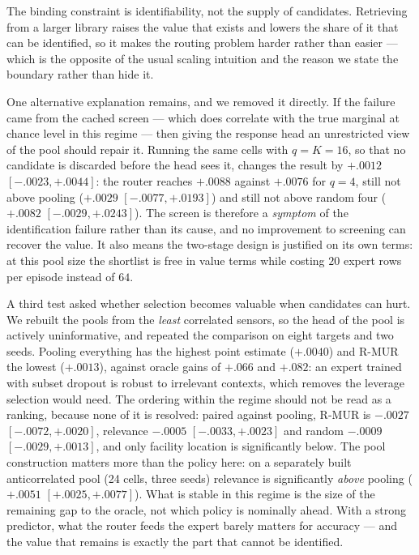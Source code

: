 The binding constraint is identifiability, not the supply of candidates.
Retrieving from a larger library raises the value that exists and lowers the
share of it that can be identified, so it makes the routing problem harder
rather than easier --- which is the opposite of the usual scaling intuition and
the reason we state the boundary rather than hide it.

One alternative explanation remains, and we removed it directly. If the failure
came from the cached screen --- which does correlate with the true marginal at
chance level in this regime --- then giving the response head an unrestricted
view of the pool should repair it. Running the same cells with $q=K=16$, so
that no candidate is discarded before the head sees it, changes the result by
$+.0012$ $[-.0023,+.0044]$: the router reaches $+.0088$ against $+.0076$ for
$q=4$, still not above pooling ($+.0029$ $[-.0077,+.0193]$) and still not above
random four ($+.0082$ $[-.0029,+.0243]$). The screen is therefore a \emph{symptom}
of the identification failure rather than its cause, and no improvement to
screening can recover the value. It also means the two-stage design is
justified on its own terms: at this pool size the shortlist is free in value
terms while costing $20$ expert rows per episode instead of $64$.

A third test asked whether selection becomes valuable when candidates can
hurt. We rebuilt the pools from the \emph{least} correlated sensors, so the head of
the pool is actively uninformative, and repeated the comparison on eight
targets and two seeds. Pooling everything has the highest point estimate
($+.0040$) and R-MUR the lowest ($+.0013$), against oracle gains of $+.066$ and
$+.082$: an expert trained with subset dropout is robust to irrelevant
contexts, which removes the leverage selection would need. The ordering within
the regime should not be read as a ranking, because none of it is resolved:
paired against pooling, R-MUR is $-.0027$ $[-.0072,+.0020]$, relevance
$-.0005$ $[-.0033,+.0023]$ and random $-.0009$ $[-.0029,+.0013]$, and only
facility location is significantly below. The pool construction matters more
than the policy here: on a separately built anticorrelated pool (24 cells,
three seeds) relevance is significantly \emph{above} pooling ($+.0051$
$[+.0025,+.0077]$). What is stable in this regime is the size of the remaining
gap to the oracle, not which policy is nominally ahead. With a strong
predictor, what the router feeds the expert barely matters for accuracy --- and
the value that remains is exactly the part that cannot be identified.

